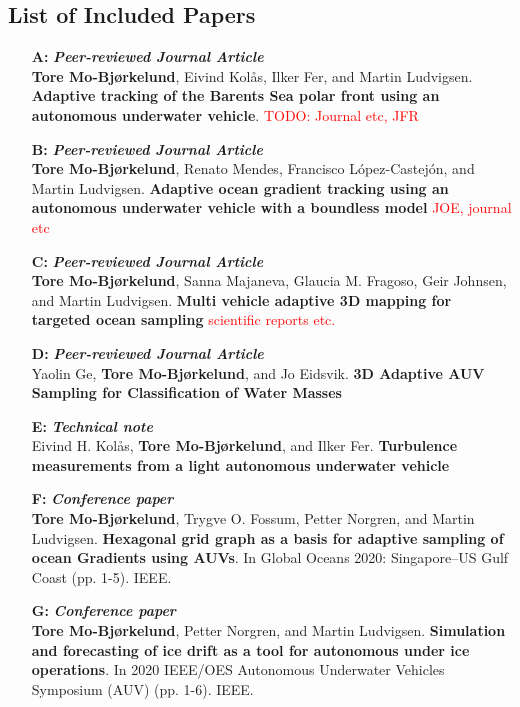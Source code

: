 \subsection*{List of Included Papers}
\begin{itemize}
    \item[\textbf{A:}] \textbf{\textit{Peer-reviewed Journal Article}}\\ \textbf{Tore Mo-Bjørkelund}, Eivind Kolås, Ilker Fer, and Martin Ludvigsen. \textbf{Adaptive tracking of the Barents Sea polar front using an autonomous underwater vehicle}. \textcolor{red}{TODO: Journal etc, JFR}
    
    \item[\textbf{B:}] \textbf{\textit{Peer-reviewed Journal Article}}\\ \textbf{Tore Mo-Bjørkelund}, Renato Mendes, Francisco López-Castejón, and Martin Ludvigsen. \textbf{Adaptive ocean gradient tracking using an autonomous underwater vehicle with a boundless model} \textcolor{red}{JOE, journal etc}
    
    \item[\textbf{C:}] \textbf{\textit{Peer-reviewed Journal Article}}\\ \textbf{Tore Mo-Bjørkelund}, Sanna Majaneva, Glaucia M. Fragoso, Geir Johnsen, and Martin Ludvigsen. \textbf{Multi vehicle adaptive 3D mapping for targeted ocean sampling} \textcolor{red}{scientific reports etc.}
    
    \item[\textbf{D:}]  \textbf{\textit{Peer-reviewed Journal Article}}\\ Yaolin Ge, \textbf{Tore Mo-Bjørkelund}, and Jo Eidsvik. \textbf{3D Adaptive AUV Sampling for Classification of Water Masses}
    
    \item[\textbf{E:}] \textbf{\textit{Technical note}}\\  Eivind H. Kolås, \textbf{Tore Mo-Bjørkelund}, and Ilker Fer. \textbf{Turbulence measurements from a light autonomous underwater vehicle}
    
    \item[\textbf{F:}] \textbf{\textit{Conference paper}}\\ \textbf{Tore Mo-Bjørkelund}, Trygve O. Fossum, Petter Norgren, and Martin Ludvigsen. \textbf{Hexagonal grid graph as a basis for adaptive sampling of ocean Gradients using AUVs}. In Global Oceans 2020: Singapore–US Gulf Coast (pp. 1-5). IEEE.
    
    \item[\textbf{G:}] \textbf{\textit{Conference paper}}\\ \textbf{Tore Mo-Bjørkelund}, Petter Norgren, and Martin Ludvigsen. \textbf{Simulation and forecasting of ice drift as a tool for autonomous under ice operations}. In 2020 IEEE/OES Autonomous Underwater Vehicles Symposium (AUV) (pp. 1-6). IEEE.
    
\end{itemize}